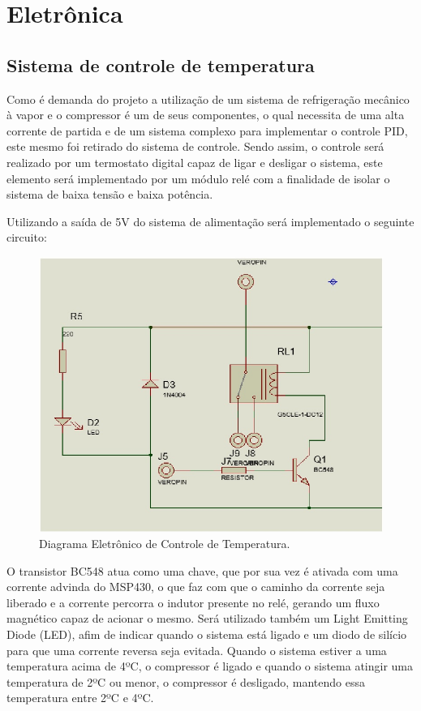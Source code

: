 \section{Eletrônica}

\subsection{Sistema de controle de temperatura}

Como é demanda do projeto a utilização de um sistema de refrigeração mecânico à vapor e o compressor é um de seus componentes, o qual necessita de uma alta corrente de partida e de um sistema complexo para implementar o controle PID, este mesmo foi retirado do sistema de controle. Sendo assim, o controle será realizado por um termostato digital capaz de ligar e desligar o sistema, este elemento será implementado por um módulo relé com a finalidade de isolar o sistema de baixa tensão e baixa potência.

Utilizando a saída de 5V do sistema de alimentação será implementado o seguinte circuito:

\begin{figure}[H]
\centering
\includegraphics[width=16cm]{figuras/controletemperatura_eletronica.jpg}
\caption{Diagrama Eletrônico de Controle de Temperatura.}
\end{figure}

O transistor BC548 atua como uma chave, que por sua vez é ativada com uma corrente advinda do MSP430, o que faz com que o caminho da corrente seja liberado e a corrente percorra o indutor presente no relé, gerando um fluxo magnético capaz de acionar o mesmo. Será utilizado também um Light Emitting Diode (LED), afim de indicar quando o sistema está ligado e um diodo de silício para que uma corrente reversa seja evitada. 
Quando o sistema estiver a uma temperatura acima de 4ºC, o compressor é ligado e quando o sistema atingir uma temperatura de 2ºC ou menor, o compressor é desligado, mantendo essa temperatura entre 2ºC e 4ºC.

